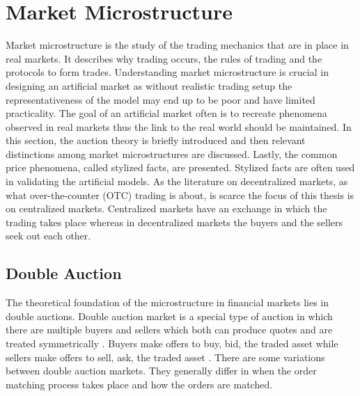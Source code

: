\section{Market Microstructure}

Market microstructure is the study of the trading mechanics that are in place 
in real markets. It describes why trading occurs, the rules of trading 
and the protocols to form trades. \citep[p. 3-4]{Has07}
Understanding market microstructure is crucial in designing an artificial market
as without realistic trading setup the representativeness of the model may end
up to be poor and have limited practicality. The goal of an artificial market often
is to recreate phenomena observed in real markets thus the link to the real world 
should be maintained. In this section, the auction theory is briefly introduced and 
then relevant distinctions among market microstructures are discussed. 
Lastly, the common price phenomena, called stylized facts, are presented. Stylized facts
are often used in validating the artificial models. As the literature on decentralized 
markets, as what over-the-counter (OTC) trading is about, is scarce the focus of this thesis is 
on centralized markets. Centralized markets have an exchange in which the trading takes place 
whereas in decentralized markets the buyers and the sellers seek out each other.


\subsection{Double Auction}

The theoretical foundation of the microstructure in financial markets lies in double auctions.
Double auction market is a special type of auction in which there
are multiple buyers and sellers which both can 
produce quotes and are treated symmetrically \citep*{Kle99}. Buyers
make offers to buy, bid, the traded asset while sellers make offers
to sell, ask, the traded asset \citep*{Moc15}. There are some variations 
between double auction markets. They generally differ in when the order matching 
process takes place and how the orders are matched. 


